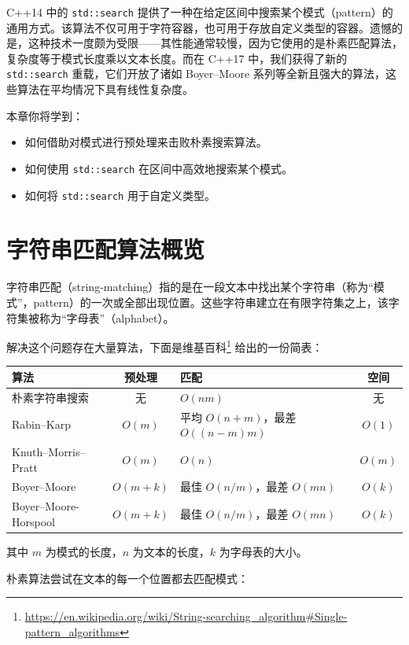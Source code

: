 C++14 中的 \texttt{std::search} 提供了一种在给定区间中搜索某个模式（pattern）的通用方式。该算法不仅可用于字符容器，也可用于存放自定义类型的容器。遗憾的是，这种技术一度颇为受限——其性能通常较慢，因为它使用的是朴素匹配算法，复杂度等于模式长度乘以文本长度。而在 C++17 中，我们获得了新的 \texttt{std::search} 重载，它们开放了诸如 Boyer–Moore 系列等全新且强大的算法，这些算法在平均情况下具有线性复杂度。

本章你将学到：

\begin{itemize}
\item 如何借助对模式进行预处理来击败朴素搜索算法。
\item 如何使用 \texttt{std::search} 在区间中高效地搜索某个模式。
\item 如何将 \texttt{std::search} 用于自定义类型。
\end{itemize}

\section{字符串匹配算法概览}

字符串匹配（string-matching）指的是在一段文本中找出某个字符串（称为“模式”，pattern）的一次或全部出现位置。这些字符串建立在有限字符集之上，该字符集被称为“字母表”（alphabet）。

解决这个问题存在大量算法，下面是维基百科\footnote{\url{https://en.wikipedia.org/wiki/String-searching_algorithm\#Single-pattern_algorithms}} 给出的一份简表：

\begin{table}[H]
\centering
\begin{tabularx}{\textwidth}{X c X c}
\toprule
算法 & 预处理 & 匹配 & 空间 \\
\midrule
朴素字符串搜索 & 无 & $O(nm)$ & 无 \\
Rabin–Karp & $O(m)$ & 平均 $O(n+m)$，最差 $O((n-m)m)$ & $O(1)$ \\
Knuth–Morris–Pratt & $O(m)$ & $O(n)$ & $O(m)$ \\
Boyer–Moore & $O(m+k)$ & 最佳 $O(n/m)$，最差 $O(mn)$ & $O(k)$ \\
Boyer–Moore-Horspool & $O(m+k)$ & 最佳 $O(n/m)$，最差 $O(mn)$ & $O(k)$ \\
\bottomrule
\end{tabularx}
\end{table}

其中 $m$ 为模式的长度，$n$ 为文本的长度，$k$ 为字母表的大小。

朴素算法尝试在文本的每一个位置都去匹配模式：


